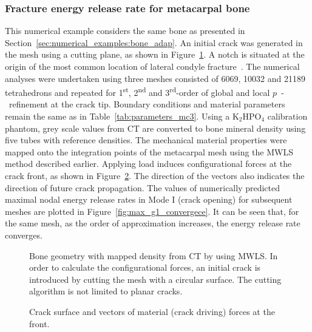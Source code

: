 \documentclass[review]{elsarticle}
\numberwithin{equation}{section}
\begin{document}
\subsubsection{Fracture energy release rate for metacarpal bone}
This numerical example considers the same bone as presented in Section~\ref{sec:numerical_examples:bone_adap}. 
An initial crack was generated in the mesh using a cutting plane, as shown in Figure~\ref{fig:bone_ct_mesh_cut}. A notch is situated at the origin of the most common location of lateral condyle fracture~\citep{jacklin2012frequency}. 
The numerical analyses were undertaken using three meshes consisted of 6069, 10032 and 21189 tetrahedrons and repeated for 1\textsuperscript{st}, 2\textsuperscript{nd} and 3\textsuperscript{rd}-order of global and local $p$~-~refinement at the crack tip. 
Boundary conditions and material parameters remain the same as in Table~\ref{tab:parameters_mc3}. 
Using a $ \mathrm {K_2 HPO_4  }$ calibration phantom, grey scale values from CT are converted to bone mineral density using five tubes with reference densities. 
The mechanical material properties were mapped onto the integration points of the metacarpal mesh using the MWLS method described earlier. 
Applying load induces configurational forces at the crack front, as shown in Figure~\ref{fig:crackfrontforce}. 
The direction of the vectors also indicates the direction of future crack propagation.
The values of numerically predicted maximal nodal energy release rates in Mode I (crack opening) for subsequent meshes are plotted in Figure~\ref{fig:max_g1_convergece}. 
It can be seen that, for the same mesh, as the order of approximation increases, the energy release rate converges. 
\begin{figure}
	\centering
		\def\svgwidth{10cm}
		
	\caption{Bone geometry with mapped density from CT by using MWLS. In order to calculate the configurational forces, an initial crack is introduced by cutting the mesh with a circular surface. The cutting algorithm is not limited to planar cracks. }
	\label{fig:bone_ct_mesh_cut}
\end{figure}

\begin{figure}
	\centering
	\def\svgwidth{12cm}
	
	\caption{Crack surface and vectors of material (crack driving) forces at the front.}
	\label{fig:crackfrontforce}
\end{figure}
\end{document}
